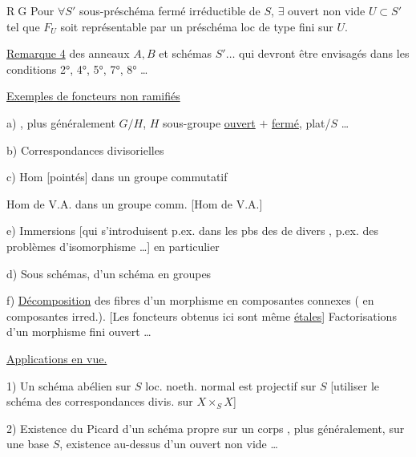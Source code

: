 \textcircled{RG} Pour $\forall S'$  sous-préschéma fermé irréductible de $S$, $\exists$ ouvert non vide $U\subset S'$ tel que $F_U$ soit représentable par un préschéma loc de type fini sur $U$.

\uline{Remarque 4}  des anneaux $A,B$ et schémas $S'\ldots$ qui devront être envisagés dans les conditions 2°, 4°, 5°, 7°, 8° \ldots

\uline{Exemples de foncteurs non ramifiés}

a) , plus généralement $G/H$, $H$ sous-groupe \uline{ouvert} $+$ \uline{fermé}, plat/$S$ \ldots

b)   Correspondances divisorielles

c) Hom [pointés] dans un groupe commutatif

 Hom de V.A. dans un groupe comm. [Hom de V.A.]

e) Immersions [qui s'introduisent p.ex. dans les pbs des  de divers , p.ex. des problèmes d'isomorphisme \ldots] en particulier 

d) Sous  schémas,  d'un schéma en groupes 

f) \uline{Décomposition} des fibres  d'un morphisme en composantes connexes ( en composantes irred.).
[Les foncteurs obtenus ici sont même \uline{étales}]
Factorisations d'un morphisme fini  ouvert \ldots

\uline{Applications en vue.}

1) Un schéma abélien sur $S$ loc. noeth. normal est projectif sur $S$
[utiliser le schéma des correspondances divis. sur $X\times_S X$]

2) Existence du Picard d'un schéma propre sur un corps \deleted{[\unsure{Seshadri M.}} , plus généralement, sur une base $S$, existence au-dessus d'un ouvert non vide \ldots
{}

